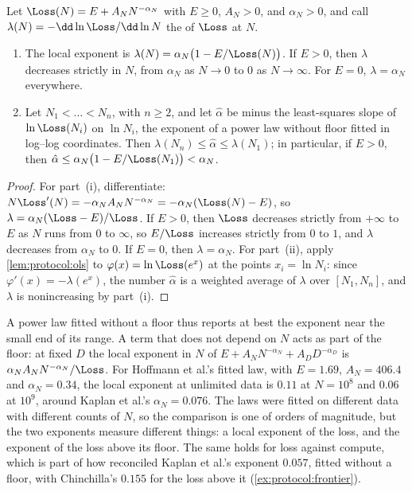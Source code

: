 \begin{refsection}
\begin{proposition}\label{prop:protocol:local}
Let $\Loss(N)=E+A_NN^{-\alpha_N}$ with $E\ge0$, $A_N>0$, and $\alpha_N>0$, and call $\lambda(N)=-\dd\ln\Loss/\dd\ln N$ the  of $\Loss$ at $N$.
\begin{enumerate}
\item The local exponent is $\lambda(N)=\alpha_N\bigl(1-E/\Loss(N)\bigr)$. If $E>0$, then $\lambda$ decreases strictly in $N$, from $\alpha_N$ as $N\to0$ to $0$ as $N\to\infty$. For $E=0$, $\lambda=\alpha_N$ everywhere.
\item Let $N_1<\dots<N_n$, with $n\ge2$, and let $\hat\alpha$ be minus the least-squares slope of $\ln\Loss(N_i)$ on $\ln N_i$, the exponent of a power law without floor fitted in log--log coordinates. Then $\lambda(N_n)\le\hat\alpha\le\lambda(N_1)$; in particular, if $E>0$, then $\hat\alpha\le\alpha_N\bigl(1-E/\Loss(N_1)\bigr)<\alpha_N$.
\end{enumerate}
\end{proposition}

\begin{proof}
For part~(i), differentiate: $N\Loss'(N)=-\alpha_NA_NN^{-\alpha_N}=-\alpha_N(\Loss(N)-E)$, so $\lambda=\alpha_N(\Loss-E)/\Loss$. If $E>0$, then $\Loss$ decreases strictly from $+\infty$ to $E$ as $N$ runs from $0$ to $\infty$, so $E/\Loss$ increases strictly from $0$ to $1$, and $\lambda$ decreases from $\alpha_N$ to $0$. If $E=0$, then $\lambda=\alpha_N$. For part~(ii), apply \cref{lem:protocol:ols} to $\varphi(x)=\ln\Loss(e^x)$ at the points $x_i=\ln N_i$: since $\varphi'(x)=-\lambda(e^x)$, the number $\hat\alpha$ is a weighted average of $\lambda$ over $[N_1,N_n]$, and $\lambda$ is nonincreasing by part~(i).
\end{proof}

A power law fitted without a floor thus reports at best the exponent near the small end of its range. A term that does not depend on $N$ acts as part of the floor: at fixed $D$ the local exponent in $N$ of $E+A_NN^{-\alpha_N}+A_DD^{-\alpha_D}$ is $\alpha_NA_NN^{-\alpha_N}/\Loss$. For Hoffmann et al.'s fitted law, with $E=1.69$, $A_N=406.4$ and $\alpha_N=0.34$, the local exponent at unlimited data is $0.11$ at $N=10^8$ and $0.06$ at $10^9$, around Kaplan et al.'s $\alpha_N=0.076$. The laws were fitted on different data with different counts of $N$, so the comparison is one of orders of magnitude, but the two exponents measure different things: a local exponent of the loss, and the exponent of the loss above its floor. The same holds for loss against compute, which is part of how \textcite{PearceSong2024} reconciled Kaplan et al.'s exponent $0.057$, fitted without a floor, with Chinchilla's $0.155$ for the loss above it (\cref{ex:protocol:frontier}).


\end{refsection}
